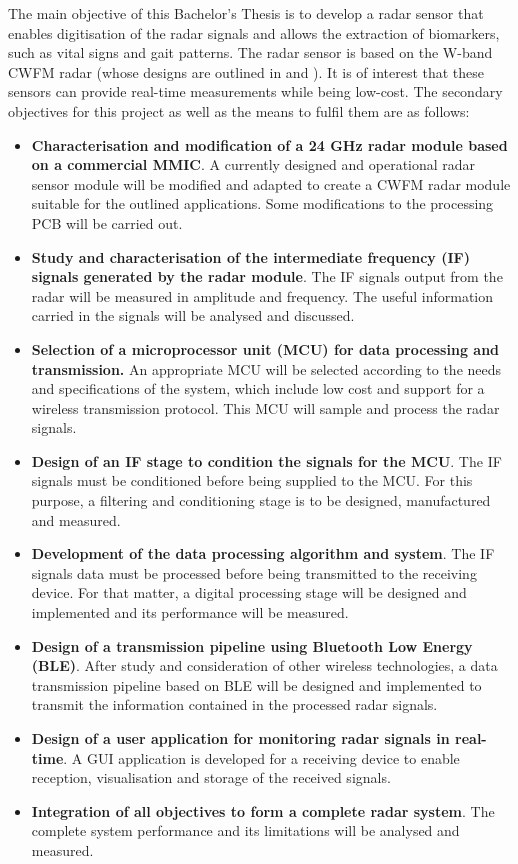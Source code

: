 	The main objective of this Bachelor's Thesis is to develop a radar sensor that enables digitisation of the radar signals and allows the extraction of biomarkers, such as vital signs and gait patterns. The radar sensor is based on the W-band CWFM radar (whose designs are  outlined in \cite{Sardinero2022} and \cite{Montesano2019}). It is of interest that these sensors can provide real-time measurements while being low-cost. The secondary objectives for this project as well as the means to fulfil them are as follows:
	\begin{itemize}
		\item \textbf{Characterisation and modification of a 24 GHz radar module based on a commercial MMIC}. A currently designed and operational radar sensor module will be modified and adapted to create a CWFM radar module suitable for the outlined applications. Some modifications to the processing PCB will be carried out.
		\item \textbf{Study and characterisation of the intermediate frequency (IF) signals generated by the radar module}. The IF signals output from the radar will be measured in amplitude and frequency. The useful information carried in the signals will be analysed and discussed.
		\item \textbf{Selection of a microprocessor unit (MCU) for data processing and transmission.} An appropriate MCU will be selected according to the needs and specifications of the system, which include low cost and support for a wireless transmission protocol. This MCU will sample and process the radar signals.
		\item \textbf{Design of an IF stage to condition the signals for the MCU}. The IF signals must be conditioned before being supplied to the MCU. For this purpose, a filtering and conditioning stage is to be designed, manufactured and measured.
		\item \textbf{Development of the data processing algorithm and system}. The IF signals data must be processed before being transmitted to the receiving device. For that matter, a digital processing stage will be designed and implemented and its performance will be measured.
		\item \textbf{Design of a transmission pipeline using Bluetooth Low Energy (BLE)}. After study and consideration of other wireless technologies, a data transmission pipeline based on BLE will be designed and implemented to transmit the information contained in the processed radar signals.
		\item \textbf{Design of a user application for monitoring radar signals in real-time}. A GUI application is developed for a receiving device to enable reception, visualisation and storage of the received signals.
		\item \textbf{Integration of all objectives to form a complete radar system}. The complete system performance and its limitations will be analysed and measured.
	\end{itemize}

